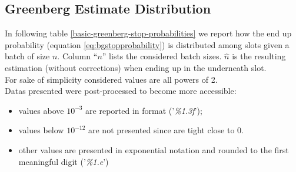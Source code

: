 \begin{appendices}
\section{Greenberg Estimate Distribution}
In following table \ref{basic-greenberg-stop-probabilities} we report how the end  up probability (equation \ref{eq:bgstopprobability}) is distributed among slots given a batch of size $n$.  Column ``$n$'' lists  the considered batch sizes. $\hat{n}$ is the resulting estimation (without corrections) when ending up in the underneath slot.\\  For sake of simplicity considered values are all powers of 2.\\
Datas presented were post-processed to become more accessible:
\begin{itemize}
\item values above $10^{-3}$ are reported in format ('\emph{\%1.3f}');
\item values below $10^{-12}$ are not presented since are tight close to 0.
\item other values are presented in exponential notation and rounded to the first meaningful digit ('\emph{\%1.e}')
\end{itemize}


\begin{sidewaystable}
\flushleft
{}
\end{sidewaystable}
\end{appendices}
